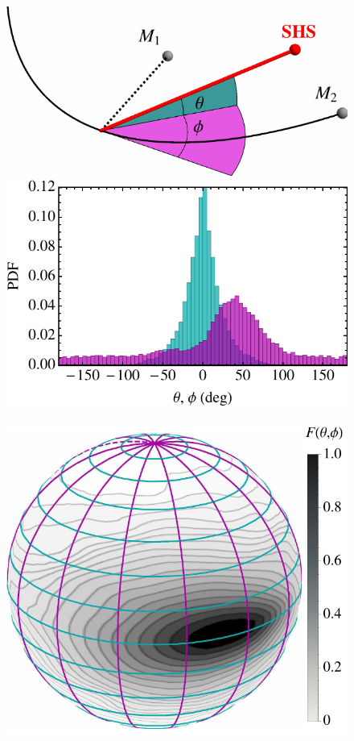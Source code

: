 \documentclass[a4paper,twocolumn]{emulateapj}
\begin{document}
\begin{figure}
\begin{minipage}[b]{0.5\linewidth}
\centering
\includegraphics[width=0.8\linewidth,clip=true]{angles-diagram}\\
\includegraphics[width=0.8\linewidth,clip=true]{angles-hist}
\end{minipage}
\begin{minipage}[b]{0.5\linewidth}
\centering
\includegraphics[width=\linewidth,clip=true]{angles-2d}

\end{minipage}
\end{figure}
\end{document}
